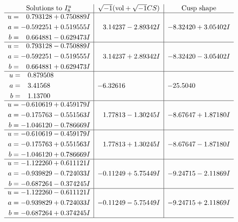 \documentclass[1p]{elsarticle_modified}
\theoremstyle{definition}
\newcommand{\I}{\sqrt{-1}}
\begin{document}
$$\begin{array}{c|c|c}  
\text{Solutions to }I^u_{8}& \I (\text{vol} + \sqrt{-1}CS) & \text{Cusp shape}\\
 \hline 
\begin{aligned}
u &= \phantom{-}0.793128 + 0.750889 I \\
a &= -0.592251 + 0.519555 I \\
b &= \phantom{-}0.664881 - 0.629473 I\end{aligned}
 & \phantom{-}3.14237 - 2.89342 I & -8.32420 + 3.05402 I \\ \hline\begin{aligned}
u &= \phantom{-}0.793128 - 0.750889 I \\
a &= -0.592251 - 0.519555 I \\
b &= \phantom{-}0.664881 + 0.629473 I\end{aligned}
 & \phantom{-}3.14237 + 2.89342 I & -8.32420 - 3.05402 I \\ \hline\begin{aligned}
u &= \phantom{-}0.879508\phantom{ +0.000000I} \\
a &= \phantom{-}3.41568\phantom{ +0.000000I} \\
b &= \phantom{-}1.13700\phantom{ +0.000000I}\end{aligned}
 & -6.32616\phantom{ +0.000000I} & -25.5040\phantom{ +0.000000I} \\ \hline\begin{aligned}
u &= -0.610619 + 0.459179 I \\
a &= -0.175763 - 0.551563 I \\
b &= -1.046120 - 0.786669 I\end{aligned}
 & \phantom{-}1.77813 - 1.30245 I & -8.67647 + 1.87180 I \\ \hline\begin{aligned}
u &= -0.610619 - 0.459179 I \\
a &= -0.175763 + 0.551563 I \\
b &= -1.046120 + 0.786669 I\end{aligned}
 & \phantom{-}1.77813 + 1.30245 I & -8.67647 - 1.87180 I \\ \hline\begin{aligned}
u &= -1.122260 + 0.611121 I \\
a &= -0.939829 - 0.724033 I \\
b &= -0.687264 - 0.374245 I\end{aligned}
 & -0.11249 + 5.75449 I & -9.24715 - 2.11869 I \\ \hline\begin{aligned}
u &= -1.122260 - 0.611121 I \\
a &= -0.939829 + 0.724033 I \\
b &= -0.687264 + 0.374245 I\end{aligned}
 & -0.11249 - 5.75449 I & -9.24715 + 2.11869 I\\
 \hline 
 \end{array}$$\newpage\newpage\renewcommand{\arraystretch}{1}
\end{document}
